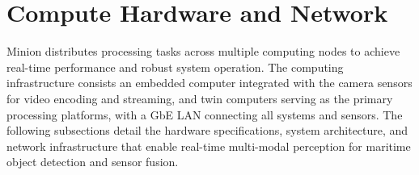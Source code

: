 \documentclass{erauthesis}
\begin{document}


\section{Compute Hardware and Network} \label{sec:Atlas_LAN}

Minion distributes processing tasks across multiple computing nodes to achieve real-time performance and robust system operation.
The computing infrastructure consists an embedded computer integrated with the camera sensors for video encoding and streaming, and twin computers serving as the primary processing platforms, with a \ac{GbE} \ac{LAN} connecting all systems and sensors. 
The following subsections detail the hardware specifications, system architecture, and network infrastructure that enable real-time multi-modal perception for maritime object detection and sensor fusion.
\end{document}
